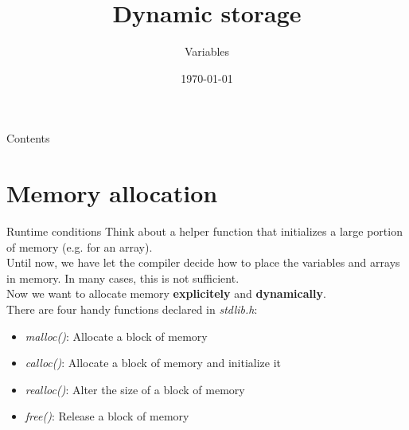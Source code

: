 


\title{Dynamic storage}
\subtitle{Variables}
\date{\today}

\usetikzlibrary{tikzmark}
\usetikzlibrary{arrows}
\usetikzlibrary{decorations.pathmorphing}



\maketitle

\begin{frame}{Contents}
	\tableofcontents
\end{frame}

\section{Memory allocation}

\begin{frame}[fragile]{Runtime conditions}
	Think about a helper function that initializes a large portion of memory (e.g. for an array).\\
	\bigskip
	Until now, we have let the compiler decide how to place the variables and arrays in memory. In many cases, this is not sufficient.\\
	Now we want to allocate memory \textbf{explicitely} and \textbf{dynamically}.\\
	\bigskip
	There are four handy functions declared in \textit{stdlib.h}:
	\begin{itemize}
		\item \textit{malloc()}: Allocate a block of memory
		\item \textit{calloc()}: Allocate a block of memory and initialize it
		\item \textit{realloc()}: Alter the size of a block of memory
		\item \textit{free()}: Release a block of memory
	\end{itemize}
\end{frame}


